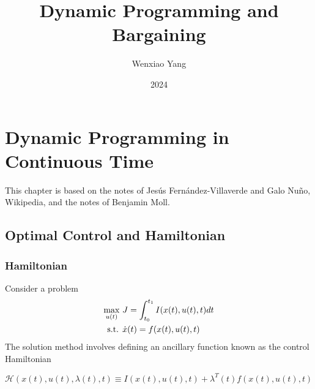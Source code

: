 \documentclass[11pt]{elegantbook}
\title{Dynamic Programming and Bargaining}
\author{Wenxiao Yang}
\institute{Haas School of Business, University of California Berkeley}
\date{2024}
\begin{document}
\maketitle

\frontmatter
\tableofcontents

\mainmatter

\chapter{Dynamic Programming in Continuous Time}
This chapter is based on the notes of Jesús Fernández-Villaverde and Galo Nuño, Wikipedia, and the notes of Benjamin Moll.

\section{Optimal Control and Hamiltonian}
\subsection{Hamiltonian}
Consider a problem
\begin{equation}
    \begin{aligned}
        \max_{u(t)}\ &J=\int_{t_0}^{t_1}I(x(t),u(t),t)dt\\
        \textnormal{s.t. }&\dot{x}(t)=f(x(t),u(t),t)\\
    \end{aligned}
    \nonumber
\end{equation}
The solution method involves defining an ancillary function known as the control Hamiltonian
\begin{definition}[Hamiltonian]
    $\mathcal{H}(x(t),u(t),\lambda(t),t)\equiv I(x(t),u(t),t)+\lambda^T(t)f(x(t),u(t),t)$
\end{definition}
\end{document}
